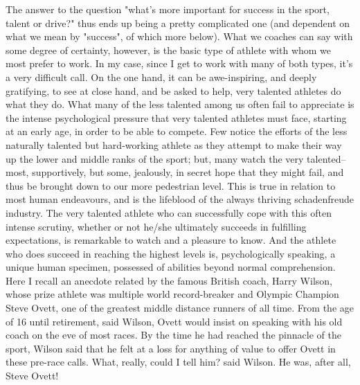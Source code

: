 The answer to the question "what's more important for success in the sport, talent or drive?" thus ends up being a pretty complicated one (and dependent on what we mean by "success", of which more below). What we coaches can say with some degree of certainty, however, is the basic type of athlete with whom we most prefer to work. In my case, since I get to work with many of both types, it's a very difficult call. On the one hand, it can be awe-inspiring, and deeply gratifying, to see at close hand, and be asked to help, very talented athletes do what they do. What many of the less talented among us often fail to appreciate is the intense psychological pressure that very talented athletes must face, starting at an early age, in order to be able to compete. Few notice the efforts of the less naturally talented but hard-working athlete as they attempt to make their way up the lower and middle ranks of the sport; but, many watch the very talented-- most, supportively, but some, jealously, in secret hope that they might fail, and thus be brought down to our more pedestrian level. This is true in relation to most human endeavours, and is the lifeblood of the always thriving schadenfreude industry. The very talented athlete who can successfully cope with this often intense scrutiny, whether or not he/she ultimately succeeds in fulfilling expectations, is remarkable to watch and a pleasure to know. And the athlete who does succeed in reaching the highest levels is, psychologically speaking, a unique human specimen, possessed of abilities beyond normal comprehension. Here I recall an anecdote related by the famous British coach, Harry Wilson, whose prize athlete was multiple world record-breaker and Olympic Champion Steve Ovett, one of the greatest middle distance runners of all time. From the age of 16 until retirement, said Wilson, Ovett would insist on speaking with his old coach on the eve of most races. By the time he had reached the pinnacle of the sport, Wilson said that he felt at a loss for anything of value to offer Ovett in these pre-race calls. What, really, could I tell him? said Wilson. He was, after all, Steve Ovett!

